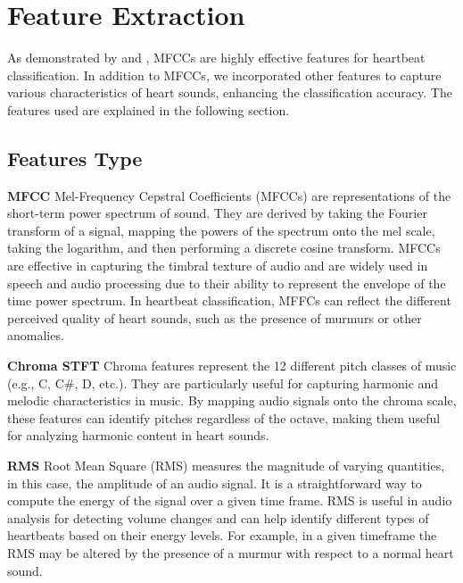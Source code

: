 \section{Feature Extraction}
As demonstrated by \cite{Raza_Mehmood_Ullah_Ahmad_Choi_On_2019} and \cite{Chen_Sun_Chen_Xie_Wu_Xu_2021}, MFCCs 
are highly effective features for heartbeat classification. In addition to MFCCs, 
we incorporated other features to capture various characteristics of heart sounds, enhancing the classification accuracy.
The features used are explained in the following section.

\subsection{Features Type}

\textbf{MFCC}\newline
Mel-Frequency Cepstral Coefficients (MFCCs) are representations of the short-term power spectrum of sound. 
They are derived by taking the Fourier transform of a signal, mapping the powers of the spectrum onto the mel 
scale, taking the logarithm, and then performing a discrete cosine transform. MFCCs are effective in capturing 
the timbral texture of audio and are widely used in speech and audio processing due to 
their ability to represent the envelope of the time power spectrum.
In heartbeat classification, MFFCs can reflect the different perceived quality of heart sounds,
such as the presence of murmurs or other anomalies.

\vspace{0.5cm}\noindent
\textbf{Chroma STFT}\newline
Chroma features represent the 12 different pitch classes of music (e.g., C, C\#, D, etc.). 
They are particularly useful for capturing harmonic and melodic characteristics in music. 
By mapping audio signals onto the chroma scale, these features can identify pitches regardless 
of the octave, making them useful for analyzing harmonic content in heart sounds.

\vspace{0.5cm}\noindent
\textbf{RMS}\newline
Root Mean Square (RMS) measures the magnitude of varying quantities, in this case, 
the amplitude of an audio signal. It is a straightforward way to compute the energy of 
the signal over a given time frame. RMS is useful in audio analysis for detecting volume 
changes and can help identify different types of heartbeats based on their energy levels.
For example, in a given timeframe the RMS may be altered by the presence of a murmur
with respect to a normal heart sound.

